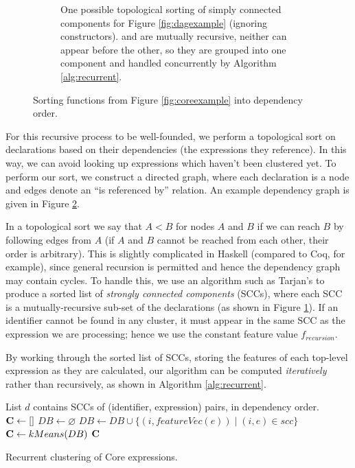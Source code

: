 \begin{figure}
\begin{subfigure}{\textwidth}
    \caption{One possible topological sorting of simply connected components for Figure \ref{fig:dagexample} (ignoring constructors).  and  are mutually recursive, neither can appear before the other, so they are grouped into one component and handled concurrently by Algorithm \ref{alg:recurrent}.}
    \label{fig:sccexample}
  \end{subfigure}
  \caption{Sorting functions from Figure \ref{fig:coreexample} into dependency order.}
  \label{fig:dependencyexample}
\end{figure}

For this recursive process to be well-founded, we perform a topological sort on declarations based on their dependencies (the expressions they reference). In this way, we can avoid looking up expressions which haven't been clustered yet. To perform our sort, we construct a directed graph, where each declaration is a node and edges denote an ``is referenced by'' relation. An example dependency graph is given in Figure \ref{fig:dependencyexample}.

In a topological sort we say that $A < B$ for nodes $A$ and $B$ if we can reach $B$ by following edges from $A$ (if $A$ and $B$ cannot be reached from each other, their order is arbitrary). This is slightly complicated in Haskell (compared to Coq, for example), since general recursion is permitted and hence the dependency graph may contain cycles. To handle this, we use an algorithm such as Tarjan's \citep{tarjan1972depth} to produce a sorted list of \emph{strongly connected components} (SCCs), where each SCC is a mutually-recursive sub-set of the declarations (as shown in Figure \ref{fig:sccexample}). If an identifier cannot be found in any cluster, it must appear in the same SCC as the expression we are processing; hence we use the constant feature value $f_{recursion}$.

By working through the sorted list of SCCs, storing the features of each top-level expression as they are calculated, our algorithm can be computed \emph{iteratively} rather than recursively, as shown in Algorithm \ref{alg:recurrent}.

\begin{algorithm}
  \begin{algorithmic}[1]
    \Require List $d$ contains SCCs of (identifier, expression) pairs, in dependency order.
      \State $\mathbf{C}  \gets []$
      \State $DB \gets \varnothing$
        \State $DB \gets DB \cup \{(i, featureVec(e)) \mid (i, e) \in scc\}$
        \State $\mathbf{C}  \gets kMeans(DB)$
      \EndFor
      \Return $\mathbf{C}$
    \EndProcedure
  \end{algorithmic}
  \caption{Recurrent clustering of Core expressions.}
  \label{alg:recurrent}
\end{algorithm}

